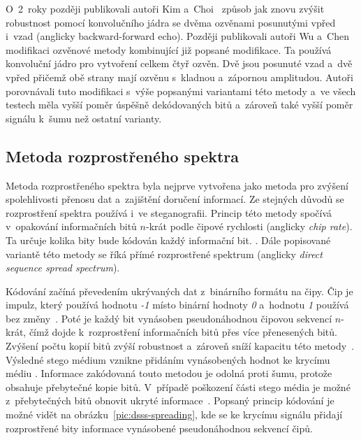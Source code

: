 O~2~roky později publikovali autoři Kim a~Choi~\cite{Kim2003} způsob jak znovu
zvýšit robustnost pomocí konvolučního jádra se dvěma ozvěnami posunutými vpřed
i~vzad (anglicky backward-forward echo). Později publikovali autoři Wu a~Chen
\cite{Wu2006} modifikaci ozvěnové metody kombinující již popsané modifikace. Ta
používá konvoluční jádro pro vytvoření celkem čtyř ozvěn. Dvě jsou posunuté
vzad a~dvě vpřed přičemž obě strany mají ozvěnu s~kladnou a~zápornou
amplitudou. Autoři porovnávali tuto modifikaci s~výše popsanými variantami této
metody a~ve všech testech měla vyšší poměr úspěšně dekódovaných bitů a~zároveň
také vyšší poměr signálu k~šumu než ostatní varianty.

\subsection*{Metoda rozprostřeného spektra}
\label{sub:dsss}

Metoda rozprostřeného spektra byla nejprve vytvořena jako metoda pro zvýšení
spolehlivosti přenosu dat a~zajištění doručení informací. Ze stejných důvodů se
rozprostření spektra používá i~ve steganografii. Princip této metody spočívá
v~opakování informačních bitů $n$-krát podle čipové rychlosti (anglicky
\textit{chip rate}). Ta určuje kolika bity bude kódován každý informační bit.
\cite{AlSabhany2020}. Dále popisované variantě této metody se říká přímé
rozprostřené spektrum (anglicky \textit{direct sequence spread spectrum}).

Kódování začíná převedením ukrývaných dat z~binárního formátu na čipy. Čip je
impulz, který používá hodnotu \textit{-1} místo binární hodnoty \textit{0}
a~hodnotu \textit{1} používá bez změny~\cite{Kuznetsov2022}. Poté je každý bit
vynásoben pseudonáhodnou čipovou sekvencí $n$-krát, čímž dojde k~rozprostření
informačních bitů přes více přenesených bitů. Zvýšení počtu kopií bitů zvýší
robustnost a~zároveň sníží kapacitu této metody~\cite{AlSabhany2020}. Výsledné
stego médium vznikne přidáním vynásobených hodnot ke krycímu médiu
\cite{Kuznetsov2022}. Informace zakódovaná touto metodou je odolná proti šumu,
protože obsahuje přebytečné kopie bitů. V~případě poškození části stego média
je možné z~přebytečných bitů obnovit ukryté informace~\cite{Djebbar2012}.
Popsaný princip kódování je možné vidět na obrázku~\ref{pic:dsss-spreading},
kde se ke krycímu signálu přidají rozprostřené bity informace vynásobené
pseudonáhodnou sekvencí čipů.

